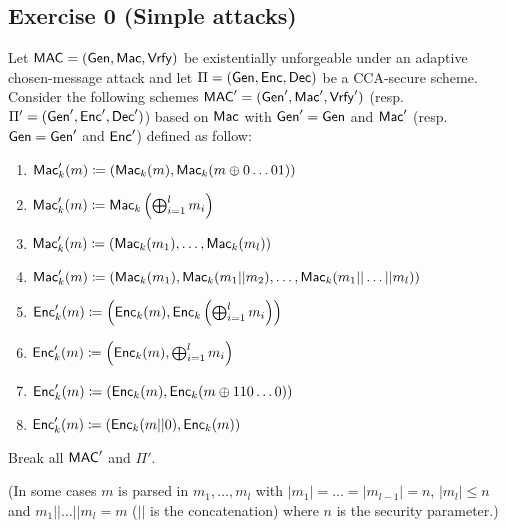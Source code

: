 
\section{}

\subsection{Exercise 0 (Simple attacks)}

Let $\MAC = (\Gen, \Mac, \Vrfy)$ be existentially unforgeable under an adaptive chosen-message attack and let $\Pi=(\Gen, \Enc, \Dec)$ be a CCA-secure scheme. Consider the following schemes $\MAC'=(\Gen', \Mac', \Vrfy')$ (resp. $\Pi'=(\Gen', \Enc', \Dec')$) based on $\Mac$ with $\Gen'=\Gen$ and $\Mac'$ (resp. $\Gen=\Gen'$ and $\Enc'$) defined as follow:
\begin{enumerate}
	\item $\Mac'_k(m) \define (\Mac_k(m), \Mac_k(m\xor 0\dots01))$
	\item $\Mac'_k(m) \define \Mac_k\left(\bigoplus_{i=1}^l m_i \right)$
	\item $\Mac'_k(m) \define (\Mac_k(m_1), \dots, \Mac_k(m_l))$
	\item $\Mac'_k(m) \define (\Mac_k(m_1), \Mac_k(m_1||m_2), \dots, \Mac_k(m_1||\dots||m_l))$
	\item $\Enc'_k(m) \define \left(\Enc_k(m), \Enc_k\left(\bigoplus_{i=1}^l m_i\right)\right)$
	\item $\Enc'_k(m) \define \left(\Enc_k(m), \bigoplus_{i=1}^l m_i\right) $
	\item $\Enc'_k(m) \define (\Enc_k(m), \Enc_k(m \oplus 110\dots0))$
	\item $\Enc'_k(m) \define (\Enc_k(m||0), \Enc_k(m))$
\end{enumerate}
Break all $\MAC'$ and $\Pi'$.

(In some cases $m$ is parsed in $m_1,\dots,m_l$ with $|m_1|=\dots=|m_{l-1}|=n$, $|m_l| \le n$ and $m_1||\dots||m_l=m$ ($||$ is the concatenation) where $n$ is the security parameter.)


